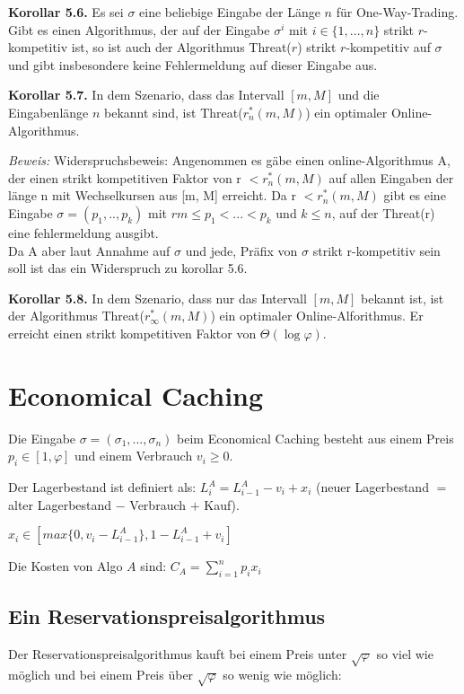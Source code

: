 \textbf{Korollar 5.6.} Es sei $\sigma$ eine beliebige Eingabe der Länge $n$ für One-Way-Trading. Gibt es einen Algorithmus, der auf der Eingabe $\sigma^{i}$ mit $i \in \{1, ..., n\}$ strikt $r$-kompetitiv ist, so ist auch der Algorithmus Threat($r$) strikt $r$-kompetitiv auf $\sigma$ und gibt insbesondere keine Fehlermeldung auf dieser Eingabe aus.

\textbf{Korollar 5.7.} In dem Szenario, dass das Intervall $[m, M]$ und die Eingabenlänge $n$ bekannt sind, ist Threat($r_{n}^{*}(m, M)$) ein optimaler Online-Algorithmus.

\textit{Beweis:} Widerspruchsbeweis: Angenommen es gäbe einen online-Algorithmus A, der einen strikt kompetitiven Faktor von r $< r_{n}^{*}(m, M)$ auf allen Eingaben der länge n mit Wechselkursen aus [m, M] erreicht. 
Da r $< r_{n}^{*}(m, M)$ gibt es eine Eingabe $\sigma = (p_{1}, .., p_{k})$ mit $rm \le p_{1} < ... < p_{k}$ und $k \le n$, auf der Threat(r) eine fehlermeldung ausgibt. \\
Da A aber laut Annahme auf $\sigma$ und jede, Präfix von $\sigma$ strikt r-kompetitiv sein soll ist das ein Widerspruch zu korollar 5.6.

\textbf{Korollar 5.8.} In dem Szenario, dass nur das Intervall $[m, M]$ bekannt ist, ist der Algorithmus Threat($r_{\infty}^{*}(m, M)$) ein optimaler Online-Alforithmus. Er erreicht einen strikt kompetitiven Faktor von $\Theta(\log \varphi)$.

\section{Economical Caching}

Die Eingabe $\sigma = (\sigma_{1}, ..., \sigma_{n})$ beim Economical Caching besteht aus einem Preis $p_{i} \in [1, \varphi]$ und einem Verbrauch $v_{i} \ge 0$.

Der Lagerbestand ist definiert als: $L_{i}^{A} = L_{i-1}^{A} - v_{i} + x_{i}$ (neuer Lagerbestand $=$ alter Lagerbestand $-$ Verbrauch $+$ Kauf).

$x_{i} \in [max\{0, v_{i}-L_{i-1}^{A}\}, 1-L_{i-1}^{A}+v_{i}]$

Die Kosten von Algo $A$ sind: $C_{A} = \sum_{i = 1}^{n} p_{i}x_{i}$

\subsection{Ein Reservationspreisalgorithmus}

Der Reservationspreisalgorithmus kauft bei einem Preis unter $\sqrt{\varphi}$ so viel wie möglich und bei einem Preis über $\sqrt{\varphi}$ so wenig wie möglich: \\


